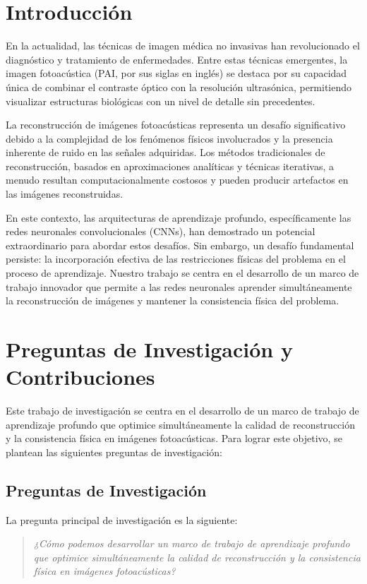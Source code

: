 \section{Introducción}

En la actualidad, las técnicas de imagen médica no invasivas han revolucionado el diagnóstico y tratamiento de enfermedades. Entre estas técnicas emergentes, la imagen fotoacústica (PAI, por sus siglas en inglés) se destaca por su capacidad única de combinar el contraste óptico con la resolución ultrasónica, permitiendo visualizar estructuras biológicas con un nivel de detalle sin precedentes.

La reconstrucción de imágenes fotoacústicas representa un desafío significativo debido a la complejidad de los fenómenos físicos involucrados y la presencia inherente de ruido en las señales adquiridas. Los métodos tradicionales de reconstrucción, basados en aproximaciones analíticas y técnicas iterativas, a menudo resultan computacionalmente costosos y pueden producir artefactos en las imágenes reconstruidas.

En este contexto, las arquitecturas de aprendizaje profundo, específicamente las redes neuronales convolucionales (CNNs), han demostrado un potencial extraordinario para abordar estos desafíos. Sin embargo, un desafío fundamental persiste: la incorporación efectiva de las restricciones físicas del problema en el proceso de aprendizaje. Nuestro trabajo se centra en el desarrollo de un marco de trabajo innovador que permite a las redes neuronales aprender simultáneamente la reconstrucción de imágenes y mantener la consistencia física del problema.

\section{Preguntas de Investigación y Contribuciones}
\label{sec:prop}

Este trabajo de investigación se centra en el desarrollo de un marco de trabajo de aprendizaje profundo que optimice simultáneamente la calidad de reconstrucción y la consistencia física en imágenes fotoacústicas. Para lograr este objetivo, se plantean las siguientes preguntas de investigación:

\subsection{Preguntas de Investigación}
\label{sec:ques}

La pregunta principal de investigación es la siguiente:
\begin{quote}
\textit{¿Cómo podemos desarrollar un marco de trabajo de aprendizaje profundo que optimice simultáneamente la calidad de reconstrucción y la consistencia física en imágenes fotoacústicas?}
\end{quote}

